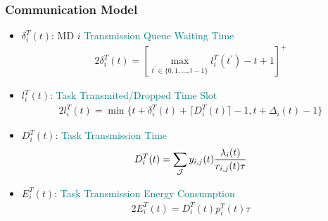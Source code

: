 \begin{frame}
	\frametitle{Communication Model}

	\vspace{2mm}

		\begin{itemize}[]

		\item $\delta_i^{T}(t)$: MD $i$ \textcolor{teal}{Transmission Queue Waiting Time}%
		\vspace{-3mm}
		\begin{alignat}{2}
			\delta_i^{T}(t) = \left[\max\limits_{t^{'}\in  \{0,1,\ldots,t-1\}} l_i^{T}(t^{'})-t+1\right]^+
			\label{1}  
		\end{alignat}
		
		
		\item $l_i^{T}(t)$: \textcolor{teal}{Task Transmited/Dropped Time Slot}
		\begin{alignat}{2}
			l_i^{T}(t) = \min \Big\{t + \delta_i^{T}(t) + \lceil{D_i^{T}(t)}\rceil - 1, t + \Delta_i(t) - 1\Big\}
			\label{2}  
		\end{alignat}
		
		
		\item $D_i^{T}(t)$:	\textcolor{teal}{Task Transmission Time}
		\vspace{-4mm}
		\begin{alignat}{2}
			D_i^{T}(t) =  \sum_{\mathcal{J}} y_{i,j}(t) {\lambda_i(t) \over r_{i,j}(t)\tau}
			\label{3}  
		\end{alignat}
	
		
		
		\item $E_i^{T}(t)$:	\textcolor{teal}{Task Transmission Energy Consumption}
		\vspace{-1mm}
		\begin{alignat}{2}
			E_i^{T}(t) = D_i^{T}(t)p_i^{T}(t)\tau
			\label{4}  
		\end{alignat}

	
	\end{itemize}
\end{frame}


